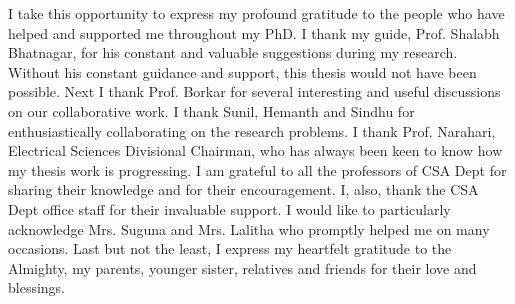 I take this opportunity to express my profound gratitude to the people who have helped and supported me throughout my PhD. I thank my guide, Prof. Shalabh Bhatnagar, for his constant and valuable suggestions during my research. Without his constant guidance and support, this thesis would not have been possible. Next I thank Prof. Borkar for several interesting and useful discussions on our collaborative work. I thank Sunil, Hemanth and Sindhu for enthusiastically collaborating on the research problems. I thank Prof. Narahari, Electrical Sciences Divisional Chairman, who has always been keen to know how my thesis work is progressing. I am grateful to all the professors of CSA Dept for sharing their knowledge and for their encouragement.  I, also, thank the CSA Dept office staff for their invaluable support.  I would like to particularly acknowledge Mrs. Suguna and Mrs. Lalitha who promptly helped me on many occasions. Last but not the least, I express my heartfelt gratitude to the Almighty, my parents, younger sister, relatives and friends for their love and blessings.



